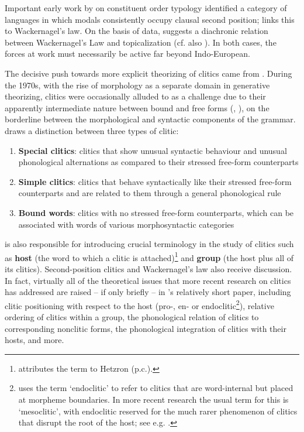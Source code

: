 \documentclass[output=paper]{../langscibook}
\begin{document}
Important early work by \citet{Steele1975} on constituent order typology identified a category of languages in which modals consistently occupy clausal second position; \citeauthor{Steele1975} links this to Wackernagel's law. On the basis of  data, \citet{Steele1977} suggests a diachronic relation between Wackernagel's Law and topicalization (cf. also \citealp{Hock1982}). In both cases, the forces at work must necessarily be active far beyond Indo-European. 

The decisive push towards more explicit theorizing of clitics came from \citet{Zwicky1977}. During the 1970s, with the rise of morphology as a separate domain in generative theorizing, clitics were occasionally alluded to as a challenge due to their apparently intermediate nature between bound and free forms (\citealp[166--169]{Matthews1974}, \citealp[3-4]{Aronoff1976}), on the borderline between the morphological and syntactic components of the grammar. \citet{Zwicky1977} draws a distinction between three types of clitic:

\begin{enumerate}
    \item \textbf{Special clitics}: clitics that show unusual syntactic behaviour and unusual phonological alternations as compared to their stressed free-form counterparts
    \item \textbf{Simple clitics}: clitics that behave syntactically like their stressed free-form counterparts and are related to them through a general phonological rule
    \item \textbf{Bound words}: clitics with no stressed free-form counterparts, which can be associated with words of various morphosyntactic categories
\end{enumerate}

\citet[9]{Zwicky1977} is also responsible for introducing crucial terminology in the study of clitics such as \textbf{host} (the word to which a clitic is attached)\footnote{\citet[note 5]{Zwicky1977} attributes the term to Hetzron (p.c.).} and \textbf{group} (the host plus all of its clitics). Second-position clitics and Wackernagel's law also receive discussion. In fact, virtually all of the theoretical issues that more recent research on clitics has addressed are raised -- if only briefly -- in \citeauthor{Zwicky1977}'s relatively short paper, including clitic positioning with respect to the host (pro-, en- or endoclitic\footnote{\citeauthor{Zwicky1977} uses the term `endoclitic' to refer to clitics that are word-internal but placed at morpheme boundaries. In more recent research the usual term for this is `mesoclitic', with endoclitic reserved for the much rarer phenomenon of clitics that disrupt the root of the host; see e.g. \citet{Smith2013}.}), relative ordering of clitics within a group, the phonological relation of clitics to corresponding nonclitic forms, the phonological integration of clitics with their hosts, and more.
\end{document}
